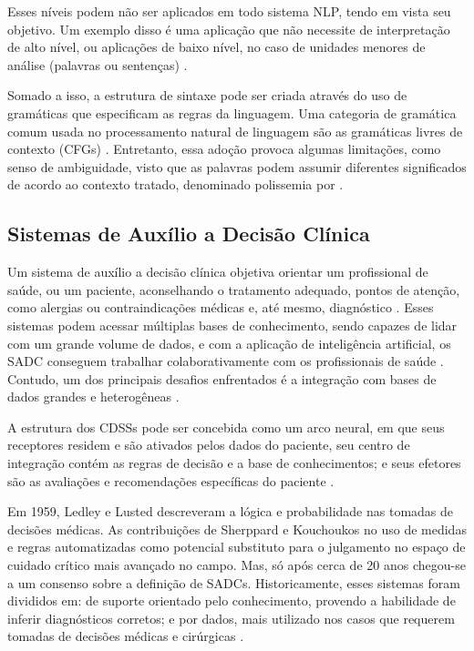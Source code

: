 \documentclass[12pt]{article}
\begin{document}
Esses níveis podem não ser aplicados em todo sistema NLP, tendo em vista seu objetivo. Um exemplo disso é uma aplicação que não necessite de interpretação de alto nível, ou aplicações de baixo nível, no caso de unidades menores de análise (palavras ou sentenças) \cite{liddy2001natural}.

Somado a isso, a estrutura de sintaxe pode ser criada através do uso de gramáticas que especificam as regras da linguagem. Uma categoria de gramática comum usada no processamento natural de linguagem são as gramáticas livres de contexto (CFGs) \cite{NLP_book}. Entretanto, essa adoção provoca algumas limitações, como senso de ambiguidade, visto que as palavras podem assumir diferentes significados de acordo ao contexto tratado, denominado polissemia por \cite{NLP_book}.


\subsection{Sistemas de Auxílio a Decisão Clínica} %

Um sistema de auxílio a decisão clínica objetiva orientar um profissional de saúde, ou um paciente, aconselhando o tratamento adequado, pontos de atenção, como alergias ou contraindicações médicas e, até mesmo, diagnóstico \cite{lichtenstein2011sistemas}. Esses sistemas podem acessar múltiplas bases de conhecimento, sendo capazes  de lidar com um grande volume de dados, e com a aplicação de inteligência artificial, os SADC conseguem trabalhar colaborativamente com os profissionais de saúde \cite{artigo_base}. Contudo, um dos principais desafios enfrentados é a integração com bases de dados grandes e heterogêneas \cite{CDSS_critical_care}.

A estrutura dos CDSSs pode ser concebida como um arco neural, em que seus receptores residem e são ativados pelos dados do paciente, seu centro de integração contém as regras de decisão e a base de conhecimentos; e seus efetores são as avaliações e recomendações específicas do paciente \cite{CDSS_critical_care}.

Em 1959, Ledley e Lusted descreveram a lógica e probabilidade nas tomadas de decisões médicas. As contribuições de Sherppard e Kouchoukos no uso de medidas e regras automatizadas como potencial substituto para o julgamento no espaço de cuidado crítico mais avançado no campo. Mas, só após cerca de 20 anos chegou-se a um consenso sobre a definição de SADCs. Historicamente, esses sistemas foram divididos em: de suporte orientado pelo conhecimento, provendo a habilidade de inferir diagnósticos corretos; e por dados, mais utilizado nos casos que requerem tomadas de decisões médicas e cirúrgicas \cite{CDSS_critical_care}.
\end{document}
